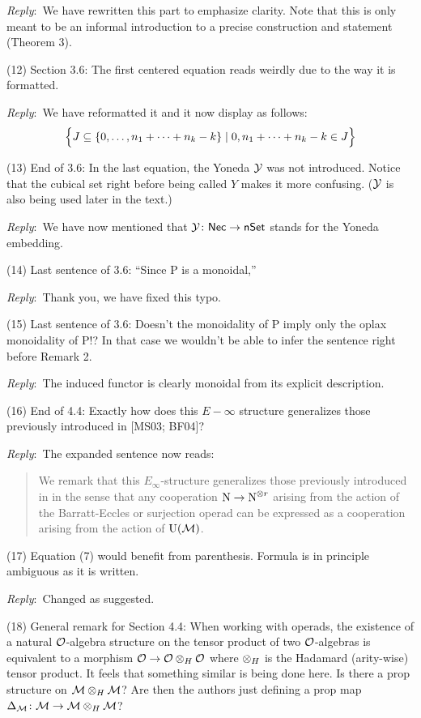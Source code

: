 \documentclass{amsart}
\newcommand{\ar}{\medskip\noindent\textit{Reply}:\ }
\newcommand{\rp}{\medskip\noindent}
\begin{document}
	\ar We have rewritten this part to emphasize clarity. Note that this is only meant to be an informal introduction to a precise construction and statement (Theorem 3).

	\rp (12) Section 3.6: The first centered equation reads weirdly due to the way it is
	formatted.

	\ar We have reformatted it and it now display as follows:
	\[
	\set[\Big]{J \subseteq \set{0,\dots,n_1+\cdots+n_k-k} \mid 0,n_1+\cdots+n_k-k \in J}
	\]

	\rp (13) End of 3.6: In the last equation, the Yoneda $\yoneda$ was not introduced.
	Notice that the cubical set right before being called $Y$ makes it more confusing.
	($\yoneda$ is also being used later in the text.)

	\ar We have now mentioned that $\yoneda \colon \Nec \to \nSet$ stands for the Yoneda embedding.

	\rp (14) Last sentence of 3.6: “Since P is a monoidal,”

	\ar Thank you, we have fixed this typo.

	\rp (15) Last sentence of 3.6: Doesn’t the monoidality of P imply only the oplax monoidality of P!? In that case we wouldn’t be able to infer the sentence right before Remark 2.

	\ar The induced functor is clearly monoidal from its explicit description.

	\rp (16) End of 4.4: Exactly how does this $E-\infty$ structure generalizes those previously introduced in [MS03; BF04]?

	\ar The expanded sentence now reads:

	\begin{quote}
		We remark that this $E_\infty$-structure generalizes those previously introduced in \cite{mcclure2003multivariable,berger2004combinatorial} in the sense that any cooperation $\chains \to \chains^{\ot r}$ arising from the action of the Barratt-Eccles or surjection operad can be expressed as a cooperation arising from the action of $\UM$.
	\end{quote}

	(17) Equation (7) would benefit from parenthesis. Formula is in principle ambiguous as it is written.

	\ar Changed as suggested.

	(18) General remark for Section 4.4: When working with operads, the existence of a natural $\cO$-algebra structure on the tensor product of two $\cO$-algebras is equivalent to a morphism $\cO \to \cO \ot_H \cO$ where $\ot_H$ is the Hadamard (arity-wise) tensor product.
	It feels that something similar is being done here.
	Is there a prop structure on $\M \ot_H \M$? Are then the authors just defining a prop map $\Delta_\M \colon \M \to \M \ot_H \M$?
\end{document}
